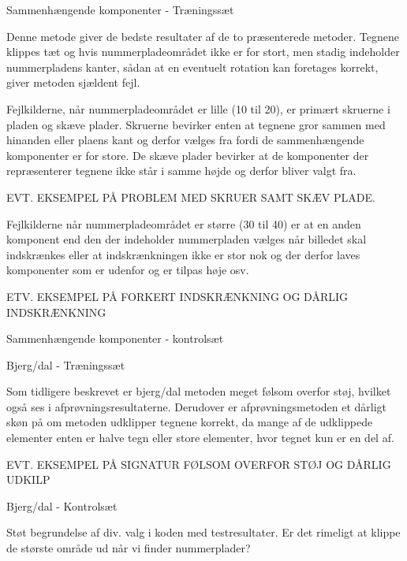 
Sammenhængende komponenter - Træningssæt

Denne metode giver de bedste resultater af de to præsenterede metoder. Tegnene klippes tæt og hvis nummerpladeområdet ikke er for stort, men stadig indeholder nummerpladens kanter, sådan at en eventuelt rotation kan foretages korrekt, giver metoden sjældent fejl.

Fejlkilderne, når nummerpladeområdet er lille (10 til 20), er primært skruerne i pladen og skæve plader. Skruerne bevirker enten at tegnene gror sammen med hinanden eller plaens kant og derfor vælges fra fordi de sammenhængende komponenter er for store. De skæve plader bevirker at de komponenter der repræsenterer tegnene ikke står i samme højde og derfor bliver valgt fra.

EVT. EKSEMPEL PÅ PROBLEM MED SKRUER SAMT SKÆV PLADE.

Fejlkilderne når nummerpladeområdet er større (30 til 40) er at en anden komponent end den der indeholder nummerpladen vælges når billedet skal indskrænkes eller at indskrænkningen ikke er stor nok og der derfor laves komponenter som er udenfor og er tilpas høje osv.

ETV. EKSEMPEL PÅ FORKERT INDSKRÆNKNING OG DÅRLIG INDSKRÆNKNING

Sammenhængende komponenter - kontrolsæt

Bjerg/dal - Træningssæt

Som tidligere beskrevet er bjerg/dal metoden meget følsom overfor støj, hvilket også ses i afprøvningsresultaterne. Derudover er afprøvningsmetoden et dårligt skøn på om metoden udklipper tegnene korrekt, da mange af de udklippede elementer enten er halve tegn eller store elementer, hvor tegnet kun er en del af.

EVT. EKSEMPEL PÅ SIGNATUR FØLSOM OVERFOR STØJ OG DÅRLIG UDKILP

Bjerg/dal - Kontrolsæt

Støt begrundelse af div. valg i koden med testresultater. Er det rimeligt at klippe de største område ud når vi finder nummerplader? 


